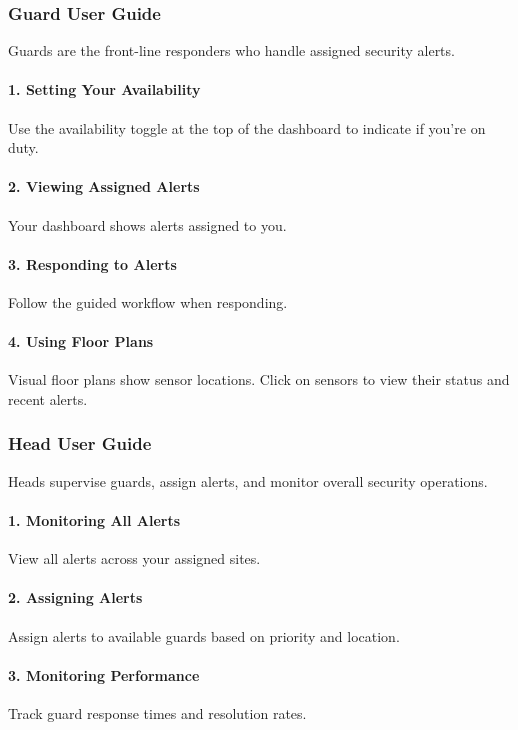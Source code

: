 \documentclass[12pt,a4paper]{article}
\begin{document}
\subsubsection{Guard User Guide}
Guards are the front-line responders who handle assigned security alerts.

\paragraph{1. Setting Your Availability}
Use the availability toggle at the top of the dashboard to indicate if you're on duty.

\paragraph{2. Viewing Assigned Alerts}
Your dashboard shows alerts assigned to you.

\paragraph{3. Responding to Alerts}
Follow the guided workflow when responding.

\paragraph{4. Using Floor Plans}
Visual floor plans show sensor locations. Click on sensors to view their status and recent alerts.

\subsubsection{Head User Guide}
Heads supervise guards, assign alerts, and monitor overall security operations.

\paragraph{1. Monitoring All Alerts}
View all alerts across your assigned sites.

\paragraph{2. Assigning Alerts}
Assign alerts to available guards based on priority and location.

\paragraph{3. Monitoring Performance}
Track guard response times and resolution rates.
\end{document}
